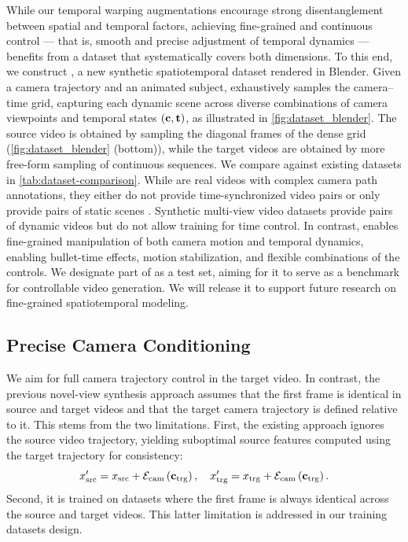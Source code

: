 
While our temporal warping augmentations encourage strong disentanglement between spatial and temporal factors, achieving fine-grained and continuous control --- that is, smooth and precise adjustment of temporal dynamics --- benefits from a dataset that systematically covers both dimensions.
To this end, we construct \textit{\nameDataset}, a new synthetic spatiotemporal dataset rendered in Blender. 
Given a camera trajectory and an animated subject, \nameDataset exhaustively samples the camera–time grid, capturing each dynamic scene across diverse combinations of camera viewpoints and temporal states $\left(\mathbf{c}, \mathbf{t}\right)$, as illustrated in \cref{fig:dataset_blender}.
The source video is obtained by sampling the diagonal frames of the dense grid (\cref{fig:dataset_blender} (bottom)), while the target videos are obtained by more free-form sampling of continuous sequences. 
We compare \nameDataset against existing datasets in \cref{tab:dataset-comparison}. 
While \cite{zhou2018stereo,ling2024dl3dv,rockwell2025dynpose} are real videos with complex camera path annotations, they either do not provide time-synchronized video pairs \cite{rockwell2025dynpose} or only provide pairs of static scenes \cite{ling2024dl3dv,zhou2018stereo}.
Synthetic multi-view video datasets \cite{Bai2025,bai2024syncammaster,vanhoorick2024gcd} provide pairs of dynamic videos but do not allow training for time control. 
In contrast, \nameDataset enables fine-grained manipulation of both camera motion and temporal dynamics, enabling bullet-time effects, motion stabilization, and flexible combinations of the controls.
We designate part of \nameDataset as a test set, aiming for it to serve as a benchmark for controllable video generation.
We will release it to support future research on fine-grained spatiotemporal modeling.










\subsection{Precise Camera Conditioning}
\label{sec:src_cam}
We aim for full camera trajectory control in the target video.
In contrast, the previous novel-view synthesis approach \cite{Bai2025} assumes that the first frame is identical in source and target videos and that the target camera trajectory is defined relative to it. 
This stems from the two limitations. 
First, the existing approach ignores the source video trajectory, yielding suboptimal source features computed using the target trajectory for consistency:
\[
x_{\text{src}}' = x_{\text{src}} + \mathcal{E}_\text{cam}\left(\mathbf{c}_{\text{trg}}\right), \quad x_{\text{trg}}' = x_{\text{trg}}+ \mathcal{E}_\text{cam}\left(\mathbf{c}_{\text{trg}}\right).
\]
Second, it is trained on datasets where the first frame is always identical across the source and target videos. 
This latter limitation is addressed in our training datasets design.

